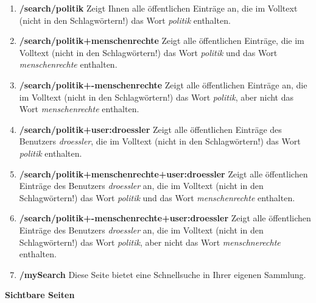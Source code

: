 \begin{enumerate}
    \item \textbf{/search/politik} \newline
    Zeigt Ihnen alle öffentlichen Einträge an, die im Volltext (nicht in den Schlagwörtern!) das Wort \textit{politik} enthalten. 
    \item \textbf{/search/politik+menschenrechte}\newline
    Zeigt alle öffentlichen Einträge, die im Volltext (nicht in den Schlagwörtern!) das Wort \textit{politik} und das Wort \textit{menschenrechte} enthalten. 
    \item \textbf{/search/politik+-menschenrechte} \newline
    Zeigt alle öffentlichen Einträge an, die im Volltext (nicht in den Schlagwörtern!) das Wort \textit{politik}, aber nicht das Wort \textit{menschenrechte} enthalten. 
    \item \textbf{/search/politik+user:droessler} \newline
    Zeigt alle öffentlichen Einträge des Benutzers \textit{droessler}, die im Volltext (nicht in den Schlagwörtern!) das Wort \textit{politik} enthalten. 
    \item \textbf{/search/politik+menschenrechte+user:droessler}\newline
    Zeigt alle öffentlichen Einträge des Benutzers \textit{droessler} an, die im Volltext (nicht in den Schlagwörtern!) das Wort \textit{politik} und das Wort \textit{menschenrechte} enthalten. 
    \item \textbf{/search/politik+-menschenrechte+user:droessler} \newline
    Zeigt alle öffentlichen Einträge des Benutzers \textit{droessler} an, die im Volltext (nicht in den Schlagwörtern!) das Wort \textit{politik}, aber nicht das Wort \textit{menschnerechte} enthalten. 
    \item \textbf{/mySearch} \newline
    Diese Seite bietet eine Schnellsuche in Ihrer eigenen Sammlung.
\end{enumerate}
\textbf{Sichtbare Seiten}
